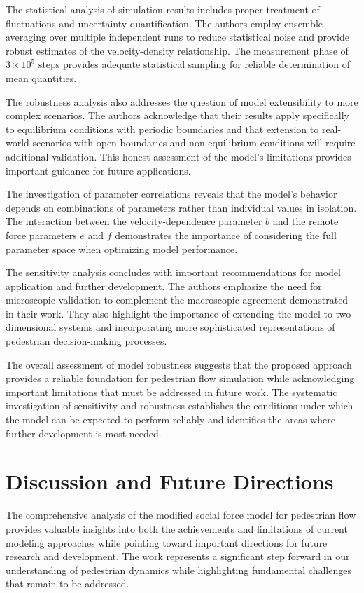 \documentclass[12pt,a4paper]{article}
\begin{document}
The statistical analysis of simulation results includes proper treatment of fluctuations and uncertainty quantification. The authors employ ensemble averaging over multiple independent runs to reduce statistical noise and provide robust estimates of the velocity-density relationship. The measurement phase of $3 \times 10^5$ steps provides adequate statistical sampling for reliable determination of mean quantities.

The robustness analysis also addresses the question of model extensibility to more complex scenarios. The authors acknowledge that their results apply specifically to equilibrium conditions with periodic boundaries and that extension to real-world scenarios with open boundaries and non-equilibrium conditions will require additional validation. This honest assessment of the model's limitations provides important guidance for future applications.

The investigation of parameter correlations reveals that the model's behavior depends on combinations of parameters rather than individual values in isolation. The interaction between the velocity-dependence parameter $b$ and the remote force parameters $e$ and $f$ demonstrates the importance of considering the full parameter space when optimizing model performance.

The sensitivity analysis concludes with important recommendations for model application and further development. The authors emphasize the need for microscopic validation to complement the macroscopic agreement demonstrated in their work. They also highlight the importance of extending the model to two-dimensional systems and incorporating more sophisticated representations of pedestrian decision-making processes.

The overall assessment of model robustness suggests that the proposed approach provides a reliable foundation for pedestrian flow simulation while acknowledging important limitations that must be addressed in future work. The systematic investigation of sensitivity and robustness establishes the conditions under which the model can be expected to perform reliably and identifies the areas where further development is most needed.

\section{Discussion and Future Directions}

The comprehensive analysis of the modified social force model for pedestrian flow provides valuable insights into both the achievements and limitations of current modeling approaches while pointing toward important directions for future research and development. The work represents a significant step forward in our understanding of pedestrian dynamics while highlighting fundamental challenges that remain to be addressed.
\end{document}
